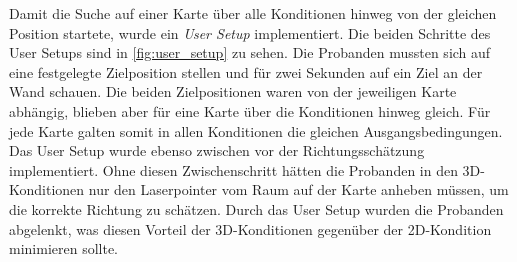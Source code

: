 Damit die Suche auf einer Karte über alle Konditionen hinweg von der gleichen Position startete, wurde ein \emph{User Setup} implementiert.
Die beiden Schritte des User Setups sind in \autoref{fig:user_setup} zu sehen.
Die Probanden mussten sich auf eine festgelegte Zielposition stellen und für zwei Sekunden auf ein Ziel an der Wand schauen.
Die beiden Zielpositionen waren von der jeweiligen Karte abhängig, blieben aber für eine Karte über die Konditionen hinweg gleich.
Für jede Karte galten somit in allen Konditionen die gleichen Ausgangsbedingungen.
Das User Setup wurde ebenso zwischen vor der Richtungsschätzung implementiert.
Ohne diesen Zwischenschritt hätten die Probanden in den 3D-Konditionen nur den Laserpointer vom Raum auf der Karte anheben müssen, um die korrekte Richtung zu schätzen.
Durch das User Setup wurden die Probanden abgelenkt, was diesen Vorteil der 3D-Konditionen gegenüber der 2D-Kondition minimieren sollte.
